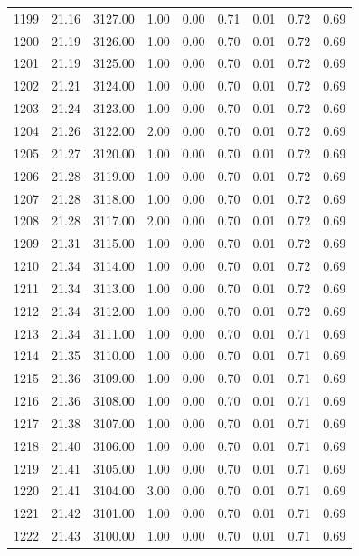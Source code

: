 \documentclass{article}\usepackage[]{graphicx}\usepackage[]{color}
\begin{document}
\begin{longtable}{rrrrrrrrr}
  1199 & 21.16 & 3127.00 & 1.00 & 0.00 & 0.71 & 0.01 & 0.72 & 0.69 \\ 
  1200 & 21.19 & 3126.00 & 1.00 & 0.00 & 0.70 & 0.01 & 0.72 & 0.69 \\ 
  1201 & 21.19 & 3125.00 & 1.00 & 0.00 & 0.70 & 0.01 & 0.72 & 0.69 \\ 
  1202 & 21.21 & 3124.00 & 1.00 & 0.00 & 0.70 & 0.01 & 0.72 & 0.69 \\ 
  1203 & 21.24 & 3123.00 & 1.00 & 0.00 & 0.70 & 0.01 & 0.72 & 0.69 \\ 
  1204 & 21.26 & 3122.00 & 2.00 & 0.00 & 0.70 & 0.01 & 0.72 & 0.69 \\ 
  1205 & 21.27 & 3120.00 & 1.00 & 0.00 & 0.70 & 0.01 & 0.72 & 0.69 \\ 
  1206 & 21.28 & 3119.00 & 1.00 & 0.00 & 0.70 & 0.01 & 0.72 & 0.69 \\ 
  1207 & 21.28 & 3118.00 & 1.00 & 0.00 & 0.70 & 0.01 & 0.72 & 0.69 \\ 
  1208 & 21.28 & 3117.00 & 2.00 & 0.00 & 0.70 & 0.01 & 0.72 & 0.69 \\ 
  1209 & 21.31 & 3115.00 & 1.00 & 0.00 & 0.70 & 0.01 & 0.72 & 0.69 \\ 
  1210 & 21.34 & 3114.00 & 1.00 & 0.00 & 0.70 & 0.01 & 0.72 & 0.69 \\ 
  1211 & 21.34 & 3113.00 & 1.00 & 0.00 & 0.70 & 0.01 & 0.72 & 0.69 \\ 
  1212 & 21.34 & 3112.00 & 1.00 & 0.00 & 0.70 & 0.01 & 0.72 & 0.69 \\ 
  1213 & 21.34 & 3111.00 & 1.00 & 0.00 & 0.70 & 0.01 & 0.71 & 0.69 \\ 
  1214 & 21.35 & 3110.00 & 1.00 & 0.00 & 0.70 & 0.01 & 0.71 & 0.69 \\ 
  1215 & 21.36 & 3109.00 & 1.00 & 0.00 & 0.70 & 0.01 & 0.71 & 0.69 \\ 
  1216 & 21.36 & 3108.00 & 1.00 & 0.00 & 0.70 & 0.01 & 0.71 & 0.69 \\ 
  1217 & 21.38 & 3107.00 & 1.00 & 0.00 & 0.70 & 0.01 & 0.71 & 0.69 \\ 
  1218 & 21.40 & 3106.00 & 1.00 & 0.00 & 0.70 & 0.01 & 0.71 & 0.69 \\ 
  1219 & 21.41 & 3105.00 & 1.00 & 0.00 & 0.70 & 0.01 & 0.71 & 0.69 \\ 
  1220 & 21.41 & 3104.00 & 3.00 & 0.00 & 0.70 & 0.01 & 0.71 & 0.69 \\ 
  1221 & 21.42 & 3101.00 & 1.00 & 0.00 & 0.70 & 0.01 & 0.71 & 0.69 \\ 
  1222 & 21.43 & 3100.00 & 1.00 & 0.00 & 0.70 & 0.01 & 0.71 & 0.69 \\ 

\end{longtable}
\end{document}
